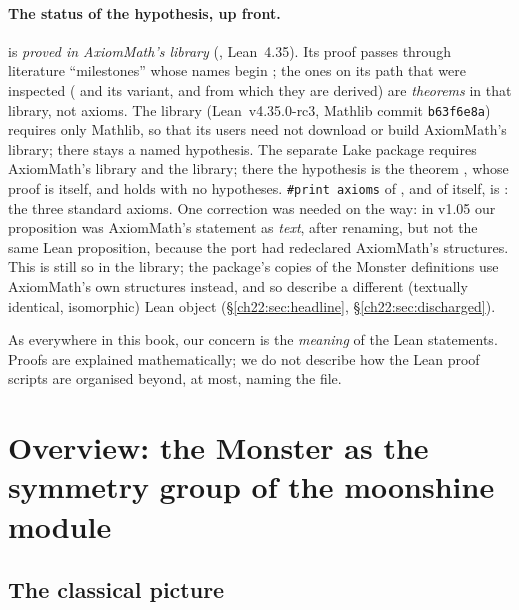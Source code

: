 \paragraph{The status of the hypothesis, up front.}   is \emph{proved in AxiomMath's library}
(, Lean~4.35).  Its proof passes
through literature ``milestones'' whose names begin ; the ones on its path that were inspected
( and its  variant, and
 from which they are derived) are \emph{theorems} in
that library, not axioms.  The library (Lean~v4.35.0-rc3, Mathlib commit \texttt{b63f6e8a}) requires only Mathlib, so
that its users need not download or build AxiomMath's library; there  stays a named hypothesis.  The
separate Lake package  requires AxiomMath's library and the library; there the hypothesis is the
theorem , whose proof is  itself, and  holds
with no hypotheses.  \texttt{\#print axioms} of , and of  itself, is
: the three standard axioms.  One correction was needed on the way: in v1.05
our proposition was AxiomMath's statement as \emph{text}, after renaming, but not the same Lean proposition, because the
port had redeclared AxiomMath's structures.  This is still so in the library; the package's copies of the Monster
definitions use AxiomMath's own structures instead, and so describe a different (textually identical, isomorphic) Lean
object (\S\ref{ch22:sec:headline}, \S\ref{ch22:sec:discharged}).

As everywhere in this book, our concern is the \emph{meaning} of the Lean statements.  Proofs are explained
mathematically; we do not describe how the Lean proof scripts are organised beyond, at most, naming the file.

\section{Overview: the Monster as the symmetry group of the moonshine module}\label{ch22:sec:overview}

\subsection{The classical picture}

